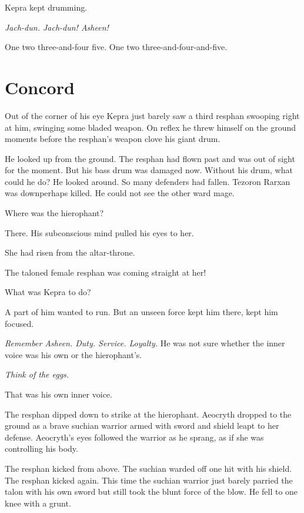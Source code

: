 \documentclass
  [a4paper,
   12pt,
   oneside
  ]%
  {article}
\newcommand{\drum}[1]{\textsf{#1}}
\begin{document}
Kepra kept drumming. 

\emph{Jach-dun. Jach-dun! Asheen!}

\drum{One two three-and-four five. One two three-and-four-and-five.}



\section{Concord}
Out of the corner of his eye Kepra just barely saw a third resphan swooping right at him, swinging some bladed weapon. On reflex he threw himself on the ground moments before the resphan's weapon clove his giant drum. 

He looked up from the ground. 
The resphan had flown past and was out of sight for the moment. 
But his bass drum was damaged now.
Without his drum, what could he do? 
He looked around. So many defenders had fallen. Tezoron Rarxan was down\dash{}perhaps killed. He could not see the other ward mage. 

Where was the hierophant? 

There.
His subconscious mind pulled his eyes to her. 

She had risen from the altar-throne.

The taloned female resphan was coming straight at her! 

What was Kepra to do? 

A part of him wanted to run. But an unseen force kept him there, kept him focused.

\emph{Remember Asheen. Duty. Service. Loyalty.} 
He was not sure whether the inner voice was his own or the hierophant's.

\emph{Think of the eggs.} 

That was his own inner voice.

The resphan dipped down to strike at the hierophant. 
Aeocryth dropped to the ground as a brave suchian warrior armed with sword and shield leapt to her defense. 
Aeocryth's eyes followed the warrior as he sprang, as if she was controlling his body.

The resphan kicked from above. 
The suchian warded off one hit with his shield. 
The resphan kicked again. 
This time the suchian warrior just barely parried the talon with his own sword but still took the blunt force of the blow. 
He fell to one knee with a grunt. 
\end{document}

